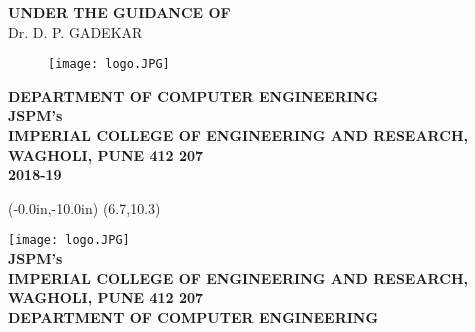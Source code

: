 \documentclass[10pt,a4paper]
{article}
\numberwithin{table}{section}
\begin{document}
	\vspace{0.3in}
	
	\begin{center}
	  \textbf{UNDER THE GUIDANCE OF}\\
	 Dr. D. P. GADEKAR
	\end{center}
	\vspace{0.7in}
	  \begin{figure}[h]
			\centering
			\texttt{[image: logo.JPG]}
		\end{figure}
		
       \vspace{0.5in}

		\begin{center}
	  \textbf{DEPARTMENT OF COMPUTER ENGINEERING\\
	  JSPM's\\
	  IMPERIAL COLLEGE OF ENGINEERING AND RESEARCH,\\
	  WAGHOLI, PUNE 412 207\\2018-19}
	  \end{center}

\newpage
\pagestyle{empty}
	\thisfancyput(-0.0in,-10.0in){%
\setlength{\unitlength}{1in}\framebox(6.7,10.3)}
\begin{center}
{\texttt{[image: logo.JPG]}\vspace{1cm}\\
\bf JSPM's\\
IMPERIAL COLLEGE OF ENGINEERING AND RESEARCH,\\
	  WAGHOLI, PUNE 412 207 \\ DEPARTMENT OF COMPUTER ENGINEERING\\}
\end{center}
\end{document}
